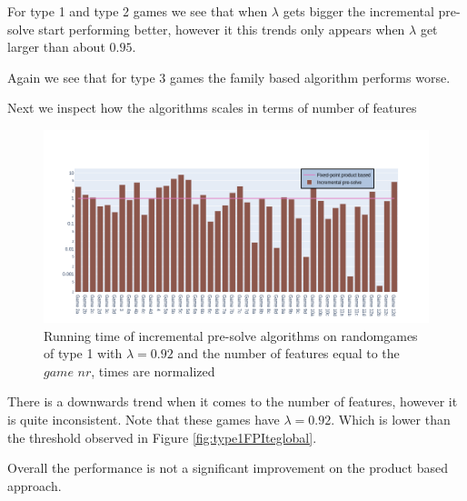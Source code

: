 For type 1 and type 2 games we see that when $\lambda$ gets bigger the incremental pre-solve start performing better, however it this trends only appears when $\lambda$ get larger than about $0.95$.

Again we see that for type 3 games the family based algorithm performs worse.

Next we inspect how the algorithms scales in terms of number of features
\begin{figure}[H]
	\includegraphics[width=1\linewidth]{"results/randomscalegames/Fixed-point product based_Incremental pre-solve_"}
	\caption{Running time of incremental pre-solve algorithms on randomgames of type 1 with $\lambda = 0.92$ and the number of features equal to the $\textit{game nr}$, times are normalized}
	\label{fig:elevatorzlnks}
\end{figure}%
There is a downwards trend when it comes to the number of features, however it is quite inconsistent. Note that these games have $\lambda=0.92$. Which is lower than the threshold observed in Figure \ref{fig:type1FPIteglobal}.

Overall the performance is not a significant improvement on the product based approach.
